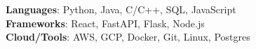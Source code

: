 \begin{itemize}[leftmargin=0.15in, label={}]
  \small{\item{\textbf{Languages}{: Python, Java, C/C++, SQL, JavaScript} \\
  \textbf{Frameworks}{: React, FastAPI, Flask, Node.js} \\
  \textbf{Cloud/Tools}{: AWS, GCP, Docker, Git, Linux, Postgres}}}
\end{itemize}